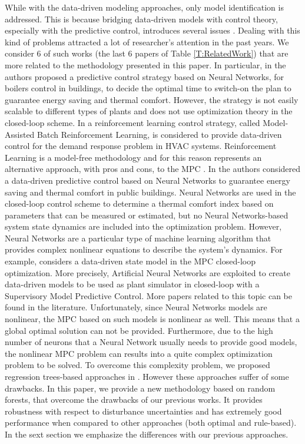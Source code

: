 {While with the data-driven modeling approaches, only model identification is addressed.
This is because bridging data-driven models with control theory, especially with the predictive control, introduces several issues \cite{Hou2013}.
Dealing with this kind of problems attracted a lot of researcher's attention in the past years.
We consider 6 of such works (the last 6 papers of Table \ref{T:RelatedWork}) that are more related to the methodology presented in this paper.
In particular, in \cite{Macarulla2017} the authors proposed a predictive control strategy based on Neural Networks, for boilers control in buildings, to decide the optimal time to switch-on the plan to guarantee energy saving and thermal comfort.
However, the strategy is not easily scalable to different types of plants and does not use optimization theory in the closed-loop scheme.
In \cite{Costanzo2016} a reinforcement learning control strategy, called Model-Assisted Batch Reinforcement Learning, is considered to provide data-driven control for the demand response problem in HVAC systems.
Reinforcement Learning is a model-free methodology and for this reason represents an alternative approach, with pros and cons, to the MPC \cite{Ernst2009TSMC}.
In \cite{Ferreira2012} the authors considered a data-driven predictive control based on Neural Networks to guarantee energy saving and  thermal comfort in public buildings.
Neural Networks are used in the closed-loop control scheme to determine a thermal comfort index based on parameters that can be measured or estimated, but no Neural Networks-based system state dynamics are included into the optimization problem.
However, Neural Networks are a particular type of machine learning algorithm that provides complex nonlinear equations to describe the system's dynamics.
For example, \cite{Afram2017} considers a data-driven state model in the MPC closed-loop optimization.
More precisely, Artificial Neural Networks are exploited to create data-driven models to be used as plant simulator in closed-loop with a Supervisory Model Predictive Control.
More papers related to this topic can be found in the literature.
Unfortunately, since Neural Networks models are nonlinear, the MPC based on such models is nonlinear as well.
This means that a global optimal solution can not be provided. Furthermore, due to the high number of neurons that a Neural Network usually needs to provide good models, the nonlinear MPC problem can results into a quite complex optimization problem to be solved.
To overcome this complexity problem, we proposed regression trees-based approaches in \cite{Behl2016,Jain2017TCPS}.
However these approaches suffer of some drawbacks.
In this paper, we provide a new methodology based on random forests, that overcome the drawbacks of our previous works.
It provides robustness with respect to disturbance uncertainties and has extremely good performance when compared to other approaches (both optimal and rule-based).
In the sext section we emphasize the differences with our previous approaches.
}


